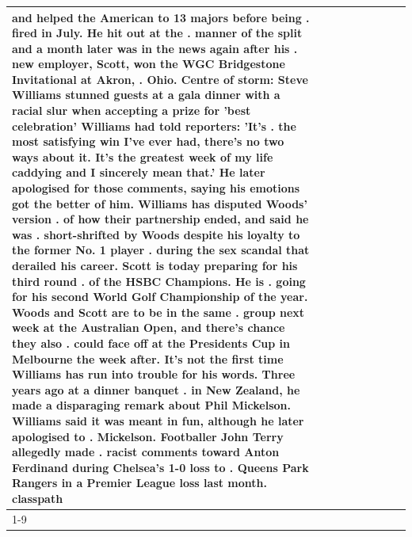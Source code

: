 \begin{table}[H]
\begin{tabular}{lllrlllll}
and helped the American to 13 majors before being . fired in July. He hit out at the . manner of the split and a month later was in the news again after his . new employer, Scott, won the WGC Bridgestone Invitational at Akron, . Ohio. Centre of storm: Steve Williams stunned guests at a gala dinner with a racial slur when accepting a prize for 'best celebration' Williams had told reporters: 'It's . the most satisfying win I've ever had, there's no two ways about it. It's the greatest week of my life caddying and I sincerely mean that.' He later apologised for those comments, saying his emotions got the better of him. Williams has disputed Woods' version . of how their partnership ended, and said he was . short-shrifted by Woods despite his loyalty to the former No. 1 player . during the sex scandal that derailed his career. Scott is today preparing for his third round . of the HSBC Champions. He is . going for his second World Golf Championship of the year. Woods and Scott are to be in the same . group next week at the Australian Open, and there's chance they also . could face off at the Presidents Cup in Melbourne the week after. It's not the first time Williams has run into trouble for his words. Three years ago at a dinner banquet . in New Zealand, he made a disparaging remark about Phil Mickelson. Williams said it was meant in fun, although he later apologised to . Mickelson. Footballer John Terry allegedly made . racist comments toward Anton Ferdinand during Chelsea's 1-0 loss to . Queens Park Rangers in a Premier League loss last month. classpath \\
\cline{1-9}

\end{tabular}
\end{table}
